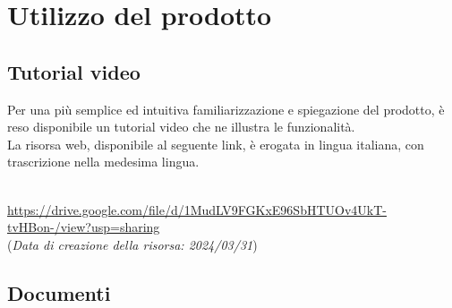 \chapter{Utilizzo del prodotto}\label{chap:istruzioni}

\section{Tutorial video}\label{sec:video}
Per una più semplice ed intuitiva familiarizzazione e spiegazione del prodotto, è reso disponibile un tutorial video che ne illustra le funzionalità.\\
La risorsa web, disponibile al seguente link, è erogata in lingua italiana, con trascrizione nella medesima lingua.\\ \\
\begin{footnotesize}
    \noindent \url{https://drive.google.com/file/d/1MudLV9FGKxE96SbHTUOv4UkT-tvHBon-/view?usp=sharing}\\
    (\textit{Data di creazione della risorsa: 2024/03/31})
\end{footnotesize}
\newpage

\section{Documenti}\label{sec:documenti}
